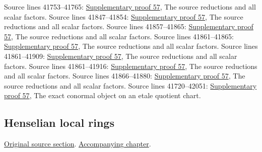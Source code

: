 \begin{AlgebraSourceRoutes}
 Source lines 41753--41765: \hyperlink{algebra_local_unramified_notes_20260929}{Supplementary proof 57}, The source reductions and all scalar factors.
 Source lines 41847--41854: \hyperlink{algebra_local_unramified_notes_20260929}{Supplementary proof 57}, The source reductions and all scalar factors.
 Source lines 41857--41865: \hyperlink{algebra_local_unramified_notes_20260929}{Supplementary proof 57}, The source reductions and all scalar factors.
 Source lines 41861--41865: \hyperlink{algebra_local_unramified_notes_20260929}{Supplementary proof 57}, The source reductions and all scalar factors.
 Source lines 41861--41909: \hyperlink{algebra_local_unramified_notes_20260929}{Supplementary proof 57}, The source reductions and all scalar factors.
 Source lines 41861--41916: \hyperlink{algebra_local_unramified_notes_20260929}{Supplementary proof 57}, The source reductions and all scalar factors.
 Source lines 41866--41880: \hyperlink{algebra_local_unramified_notes_20260929}{Supplementary proof 57}, The source reductions and all scalar factors.
 Source lines 41720--42051: \hyperlink{algebra_local_unramified_notes_20260929}{Supplementary proof 57}, The exact conormal object on an etale quotient chart.
\end{AlgebraSourceRoutes}

\subsection{Henselian local rings}
\hypertarget{algebra-source-section-henselian}{}
\noindent\href{https://github.com/stacks/stacks-project/blob/a04446e57ec1fbc252a871afcec7752fb2807b14/algebra.tex\#L42062}{Original source section}. \href{algebra.pdf\#nameddest=section-henselian}{Accompanying chapter}.

